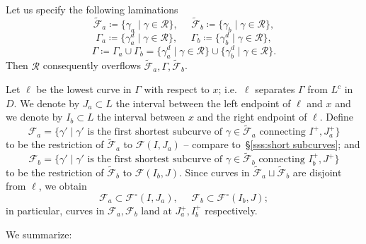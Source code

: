 \documentclass{amsart}
\renewcommand{\sp}{{\ \ }}
\newcommand{\1}{{\mathbb 1 }}
\newcommand{\Fam}{{\mathcal F}}
\newcommand\RR{\mathcal{R}}
\theoremstyle{remark}
\numberwithin{equation}{section}
\theoremstyle{definition}
\begin{document}
Let us specify the following laminations
 \[
\widetilde \Fam_a \coloneqq \{ \gamma_a\mid \gamma\in \RR\}, \sp\sp\sp\widetilde \Fam_b\coloneqq \{\gamma_b\mid \gamma\in \RR\}
,\]
 \[
 \Gamma_a \coloneqq \{ \gamma^d_a\mid \gamma\in \RR\}, \sp\sp\sp \Gamma_b\coloneqq \{\gamma^d_b\mid \gamma\in \RR\}
,\]
\begin{equation}
\label{eq:Gamma}
 \Gamma\coloneqq \Gamma_a\cup \Gamma_b=\{\gamma_a^d\mid \gamma\in \RR\} \cup  \{\gamma_b^d\mid \gamma\in \RR\}.
\end{equation}
Then $\RR$ consequently overflows $\widetilde \Fam_a, \Gamma, \widetilde \Fam_b$.






 Let $\ell$ be the lowest curve in $\Gamma$ with respect to $x$; i.e.~$\ell$ separates $\Gamma$ from $L^c$ in $D$. We denote by $J_a\subset L$ the interval between the left endpoint of $\ell$ and $x$ and we denote by $I_b\subset L$ the interval between $x$ and the right endpoint of $\ell$. Define  
\begin{equation}
\label{eq:F_a:dfn}
\Fam_a=\{\gamma'\mid \gamma' \text{ is the first shortest subcurve of }\gamma\in \widetilde \Fam_a \text{ connecting }I^+, J^+_a\}\end{equation} 
to be the restriction of $\widetilde \Fam_a$ to $ \Fam(I,J_a)$ 
-- compare to~\S\ref{sss:short subcurves}; and
\begin{equation}
\label{eq:F_b:dfn}
\Fam_b=\{\gamma'\mid \gamma' \text{ is the first shortest subcurve of }\gamma\in \widetilde \Fam_b \text{ connecting }I^+_b, J^+\}
\end{equation}
to be the restriction of $\widetilde \Fam_b$ to $ \Fam(I_b,J)$.   Since curves in $\widetilde \Fam_a\sqcup \widetilde \Fam_b$ are disjoint from $\ell $, we obtain
\[ \Fam_a\subset  \Fam^\circ(I,J_a),\sp\sp\sp \Fam_b\subset \Fam^\circ(I_b,J);\]
in particular, curves in $\Fam_a, \Fam_b$ land at $J_a^+, I_b^+$ respectively. 

We summarize:
\end{document}
